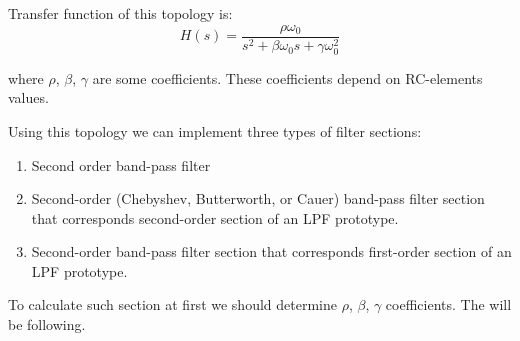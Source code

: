 Transfer function of this topology is:
\begin{equation}
 H(s) = \frac{\rho\omega_0}{s^2+\beta\omega_0s+\gamma\omega_0^2} 
\label{eq:sk-bpf-trfunc}
\end{equation}

where $\rho$, $\beta$, $\gamma$  are some coefficients. These coefficients 
depend on RC-elements values.


Using this topology we can implement three types of filter sections:

\begin{enumerate}
 \item Second order band-pass filter
 \item Second-order (Chebyshev, Butterworth, or Cauer) band-pass filter section 
that corresponds second-order section of an LPF prototype.
 \item Second-order band-pass filter section that corresponds first-order 
section of an LPF prototype.
\end{enumerate}

To calculate such section at first we should determine $\rho$, $\beta$, 
$\gamma$ coefficients. The will be following.

